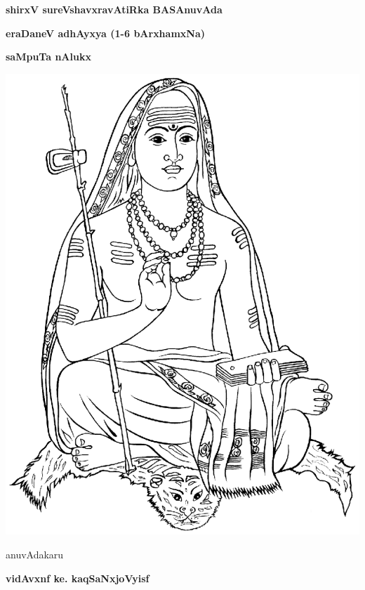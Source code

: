 \documentclass{book}
\begin{document}
\mbox{}\thispagestyle{empty}
\vskip 1.5cm
\begin{center}
{\Huge\bfseries shirxV sureVshavxravAtiRka BASAnuvAda}
\bigskip

{\Large\bfseries eraDaneV adhAyxya (1-6 bArxhamxNa)}
\bigskip

{\Large\bfseries saMpuTa nAlukx}
\vfill

\includegraphics[scale=0.7]{shankaracharya.eps}

\vfill

anuvAdakaru
\smallskip

{\large\bfseries vidAvxnf ke. kaqSaNxjoVyisf}
\vskip 2cm

\end{center}
\end{document}
